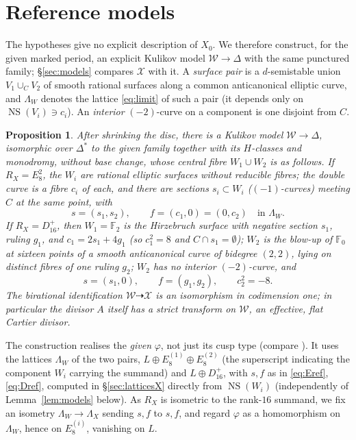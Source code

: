 \documentclass[12pt]{article}
\newcommand{\F}{\mathbb F}
\newcommand{\NS}{\operatorname{NS}}
\newcommand{\calX}{\mathcal X}
\newcommand{\calW}{\mathcal W}
\newtheorem{proposition}[theorem]{Proposition}
\theoremstyle{definition}
\theoremstyle{remark}
\begin{document}
\section{Reference models}\label{sec:reference}

The hypotheses give no explicit description of \(X_0\). We therefore
construct, for the given marked period, an explicit Kulikov model
\(\calW\to\Delta\) with the same punctured family; \S\ref{sec:models}
compares \(\calX\) with it. A \emph{surface pair} is a \(d\)-semistable union \(V_1\cup_CV_2\) of
smooth rational surfaces along a common anticanonical elliptic curve,
and \(\Lambda_W\) denotes the lattice \eqref{eq:limit} of such a pair
(it depends only on \(\NS(V_i)\ni c_i\)). An \emph{interior}
\((-2)\)-curve on a component is one disjoint from \(C\).

\begin{proposition}\label{prop:reference}
After shrinking the disc, there is a Kulikov model \(\calW\to\Delta\),
isomorphic over \(\Delta^*\) to the given family together with its
\(H\)-classes and monodromy, without base change, whose central fibre
\(W_1\cup W_2\) is as follows.
If \(R_X=E_8^2\), the \(W_i\) are rational elliptic surfaces
without reducible fibres; the double curve is a fibre \(c_i\) of each,
and there are sections \(s_i\subset W_i\) (\((-1)\)-curves) meeting
\(C\) at the same point, with
\begin{equation}\label{eq:Eref}
 s=(s_1,s_2),\qquad f=(c_1,0)=(0,c_2)\quad\text{in }\Lambda_W .
\end{equation}
If \(R_X=D_{16}^+\), then \(W_1=\F_2\) is the Hirzebruch
surface with negative section \(s_1\), ruling \(g_1\), and
\(c_1=2s_1+4g_1\) (so \(c_1^2=8\) and
\(C\cap s_1=\emptyset\)); \(W_2\) is the blow-up of \(\F_0\) at sixteen
points of a smooth anticanonical curve of bidegree \((2,2)\), lying on
distinct fibres of one ruling \(g_2\); \(W_2\) has no interior
\((-2)\)-curve, and
\begin{equation}\label{eq:Dref}
 s=(s_1,0),\qquad f=(g_1,g_2),\qquad c_2^2=-8 .
\end{equation}
The birational identification \(\calW\dashrightarrow\calX\) is an
isomorphism in codimension one; in particular the divisor \(A\)
itself has a strict transform on \(\calW\), an effective, flat Cartier
divisor.
\end{proposition}

The construction realises the \emph{given} \(\varphi\), not just its
cusp type (compare \cite[Proposition~7.23]{AE}). It uses the
lattices \(\Lambda_W\) of the two pairs,
\(L\oplus E_8^{(1)}\oplus E_8^{(2)}\) (the superscript indicating the
component \(W_i\) carrying the summand) and \(L\oplus D_{16}^+\), with
\(s,f\) as in \eqref{eq:Eref}, \eqref{eq:Dref}, computed in
\S\ref{sec:latticesX} directly from \(\NS(W_i)\) (independently of
Lemma~\ref{lem:models} below). As \(R_X\) is isometric to the rank-\(16\)
summand, we fix an isometry \(\Lambda_W\to\Lambda_X\) sending \(s,f\)
to \(s,f\), and regard \(\varphi\) as a homomorphism on \(\Lambda_W\),
hence on \(E_8^{(i)}\), vanishing on \(L\).
\end{document}
